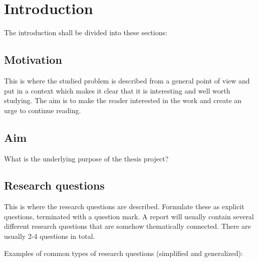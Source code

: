 

\chapter{Introduction}
\label{cha:introduction}

The introduction shall be divided into these sections:

\section{Motivation}
\label{sec:motivation}

\cite{scigen}

This is where the studied problem is described from a general
point of view and put in a context which makes it clear that
it is interesting and well worth studying. The aim is to make
the reader interested in the work and create an urge to
continue reading.

\section{Aim}
\label{sec:aim}


What is the underlying purpose of the thesis project?

\section{Research questions}
\label{sec:research-questions}


This is where the research questions are described.
Formulate these as explicit questions, terminated with a
question mark. A report will usually contain several different
research questions that are somehow thematically connected.
There are usually 2-4 questions in total.

Examples of common types of research questions (simplified
and generalized):

